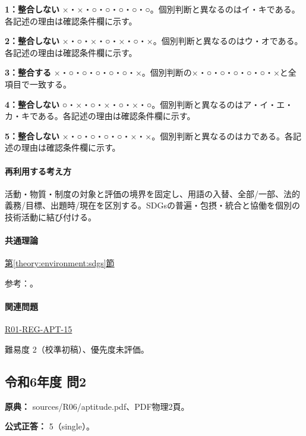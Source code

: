 \noindent\textbf{1：整合しない} ×・×・○・○・○・○・○。個別判断と異なるのはイ・キである。各記述の理由は確認条件欄に示す。\par

\noindent\textbf{2：整合しない} ×・○・×・○・×・○・×。個別判断と異なるのはウ・オである。各記述の理由は確認条件欄に示す。\par

\noindent\textbf{3：整合する} ×・○・○・○・○・○・×。個別判断の×・○・○・○・○・○・×と全項目で一致する。\par

\noindent\textbf{4：整合しない} ○・×・○・×・○・×・○。個別判断と異なるのはア・イ・エ・カ・キである。各記述の理由は確認条件欄に示す。\par

\noindent\textbf{5：整合しない} ×・○・○・○・○・×・×。個別判断と異なるのはカである。各記述の理由は確認条件欄に示す。\par

\paragraph{再利用する考え方} 活動・物質・制度の対象と評価の境界を固定し、用語の入替、全部/一部、法的義務/目標、出題時/現在を区別する。SDGsの普遍・包摂・統合と協働を個別の技術活動に結び付ける。

\paragraph{共通理論} \hyperref[theory:environment:sdgs]{第\ref*{theory:environment:sdgs}節}

\par 参考：\cite{env_sdgs_agenda,env_sdgs_un}。

\paragraph{関連問題} \hyperref[q:r01-reg-apt-15]{R01-REG-APT-15}

\par 難易度 2（校準初稿）、優先度未評価。

\subsection{令和6年度 問2}
\label{q:r06-reg-apt-02}

\noindent\textbf{原典：} sources/R06/aptitude.pdf、PDF物理2頁。

\textbf{公式正答：} 5（single）。

